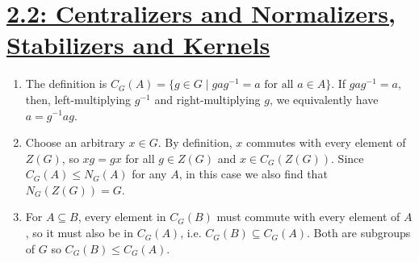 \documentclass[]{article}
\begin{document}
\section*{\underline{2.2: Centralizers and Normalizers, Stabilizers and Kernels}}
\begin{enumerate}

\item The definition is $C_G(A) = \{ g\in G\mid gag^{-1} = a\text{ for all }a\in A\}$. If $gag^{-1} = a$, then, left-multiplying $g^{-1}$ and right-multiplying $g$, we equivalently have $a = g^{-1}ag$.


\item Choose an arbitrary $x\in G$. By definition, $x$ commutes with every element of $Z(G)$, so $xg = gx$ for all $g \in Z(G)$ and $x \in C_G(Z(G))$. Since $C_G(A) \leq N_G(A)$ for any $A$, in this case we also find that $N_G(Z(G)) = G$.


\item For $A \subseteq B$, every element in $C_G(B)$ must commute with every element of $A$, so it must also be in $C_G(A)$, i.e. $C_G(B) \subseteq C_G(A)$. Both are subgroups of $G$ so $C_G(B) \leq C_G(A)$.



\end{enumerate}
\end{document}
